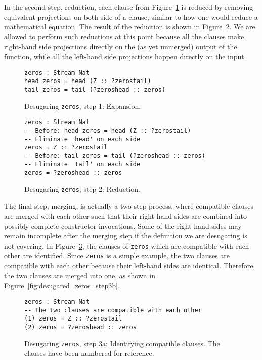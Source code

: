 In the second step, reduction, each clause from
Figure~\ref{fig:desugared_zeros_step1} is reduced by removing equivalent
projections on both side of a clause, similar to how one would reduce a
mathematical equation. The result of the reduction is shown in
Figure~\ref{fig:desugared_zeros_step2}. We are allowed to perform such
reductions at this point because all the clauses make right-hand side
projections directly on the (as yet unmerged) output of the function, while all
the left-hand side projections happen directly on the input.

\begin{figure}
\begin{lstlisting}[mathescape]
zeros : Stream Nat
head zeros = head (Z :: ?zerostail)
tail zeros = tail (?zeroshead :: zeros)
\end{lstlisting}
  \caption{Desugaring \texttt{zeros}, step 1: Expansion.}
  \label{fig:desugared_zeros_step1}
\end{figure}

\begin{figure}
\begin{lstlisting}[mathescape]
zeros : Stream Nat
-- Before: head zeros = head (Z :: ?zerostail)
-- Eliminate 'head' on each side
zeros = Z :: ?zerostail
-- Before: tail zeros = tail (?zeroshead :: zeros)
-- Eliminate 'tail' on each side
zeros = ?zeroshead :: zeros
\end{lstlisting}
  \caption{Desugaring \texttt{zeros}, step 2: Reduction.}
  \label{fig:desugared_zeros_step2}
\end{figure}

The final step, merging, is actually a two-step process, where compatible clauses are
merged with each other such that their right-hand sides are combined into
possibly complete constructor invocations. Some of the right-hand sides may remain
incomplete after the merging step if the definition we are desugaring is not
covering. In Figure~\ref{fig:desugared_zeros_step3a}, the clauses of
\texttt{zeros} which are compatible with each other are identified. Since
\texttt{zeros} is a simple example, the two clauses are compatible with each
other because their left-hand sides are identical. Therefore, the two clauses are
merged into one, as shown in Figure~\ref{fig:desugared_zeros_step3b}.

\begin{figure}
\begin{lstlisting}[mathescape]
zeros : Stream Nat
-- The two clauses are compatible with each other
(1) zeros = Z :: ?zerostail
(2) zeros = ?zeroshead :: zeros
\end{lstlisting}
  \caption{Desugaring \texttt{zeros}, step 3a: Identifying compatible
    clauses. The clauses have been numbered for reference.}
  \label{fig:desugared_zeros_step3a}
\end{figure}

